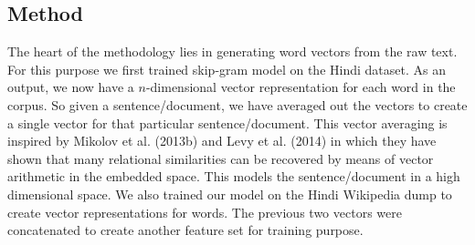 \def\DevnagVersion{2.15}\documentclass[11pt]{article}
\begin{document}

\subsection{Method}
The heart of the methodology lies in generating word vectors from the raw text. For this purpose we first trained skip-gram model on the Hindi dataset. As an output, we now have a $n$-dimensional vector representation for each word in the corpus. So given a sentence/document, we have averaged out the vectors to create a single vector for that particular sentence/document. This vector averaging is inspired by Mikolov et al. (2013b) and Levy et al. (2014) in which they have shown that many relational similarities can be recovered by means of vector arithmetic in the embedded space. This models the sentence/document in a high dimensional space.
We also trained our model on the Hindi Wikipedia dump to create vector representations for words. The previous two vectors were concatenated to create another feature set for training purpose.

\end{document}
